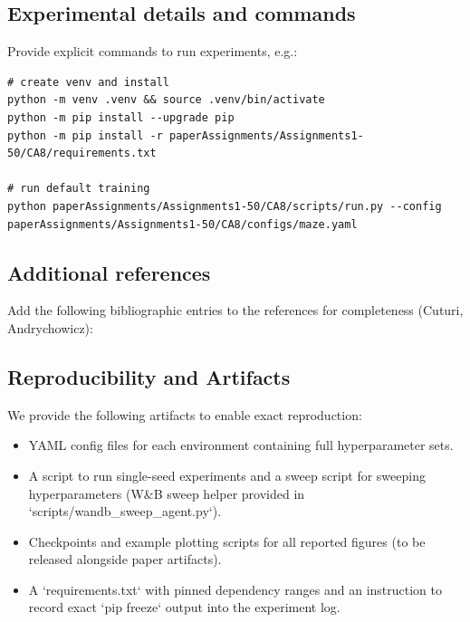 \documentclass[10pt,twocolumn]{article}
\begin{document}
\subsection{Experimental details and commands}
Provide explicit commands to run experiments, e.g.:
\begin{verbatim}
# create venv and install
python -m venv .venv && source .venv/bin/activate
python -m pip install --upgrade pip
python -m pip install -r paperAssignments/Assignments1-50/CA8/requirements.txt

# run default training
python paperAssignments/Assignments1-50/CA8/scripts/run.py --config paperAssignments/Assignments1-50/CA8/configs/maze.yaml
\end{verbatim}

\subsection{Additional references}
Add the following bibliographic entries to the references for completeness (Cuturi, Andrychowicz):

\subsection{Reproducibility and Artifacts}
We provide the following artifacts to enable exact reproduction:
\begin{itemize}
  \item YAML config files for each environment containing full hyperparameter sets.
  \item A script to run single-seed experiments and a sweep script for sweeping hyperparameters (W\&B sweep helper provided in `scripts/wandb_sweep_agent.py`).
  \item Checkpoints and example plotting scripts for all reported figures (to be released alongside paper artifacts).
  \item A `requirements.txt` with pinned dependency ranges and an instruction to record exact `pip freeze` output into the experiment log.
\end{itemize}
\end{document}
